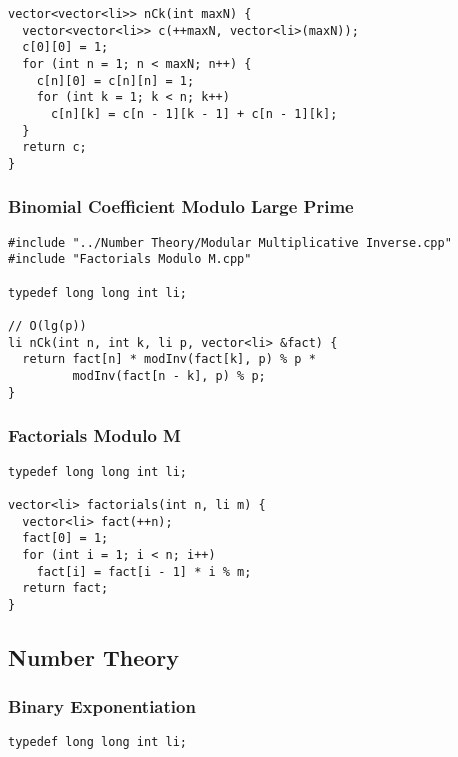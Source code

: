 \documentclass[twoside]{article}
\newcommand{\fileTitleStyle}{\large\underline}
\begin{document}
\begin{multicols*}{2}
\begin{verbatim}
vector<vector<li>> nCk(int maxN) {
  vector<vector<li>> c(++maxN, vector<li>(maxN));
  c[0][0] = 1;
  for (int n = 1; n < maxN; n++) {
    c[n][0] = c[n][n] = 1;
    for (int k = 1; k < n; k++)
      c[n][k] = c[n - 1][k - 1] + c[n - 1][k];
  }
  return c;
}
\end{verbatim}

\subsubsectionfont{\centering\bfseries\Large}
\subsubsectionfont{\fileTitleStyle}
\subsubsection*{Binomial Coefficient Modulo Large Prime}
\begin{verbatim}
#include "../Number Theory/Modular Multiplicative Inverse.cpp"
#include "Factorials Modulo M.cpp"

typedef long long int li;

// O(lg(p))
li nCk(int n, int k, li p, vector<li> &fact) {
  return fact[n] * modInv(fact[k], p) % p *
         modInv(fact[n - k], p) % p;
}
\end{verbatim}

\subsubsectionfont{\centering\bfseries\Large}
\subsubsectionfont{\fileTitleStyle}
\subsubsection*{Factorials Modulo M}
\begin{verbatim}
typedef long long int li;

vector<li> factorials(int n, li m) {
  vector<li> fact(++n);
  fact[0] = 1;
  for (int i = 1; i < n; i++)
    fact[i] = fact[i - 1] * i % m;
  return fact;
}
\end{verbatim}

\subsectionfont{\centering\bfseries\LARGE}
\vspace{0em}
\subsection*{Number Theory}
\vspace{2em}
\subsubsectionfont{\centering\bfseries\Large}
\subsubsectionfont{\fileTitleStyle}
\subsubsection*{Binary Exponentiation}
\begin{verbatim}
typedef long long int li;


\end{verbatim}
\end{multicols*}
\end{document}
